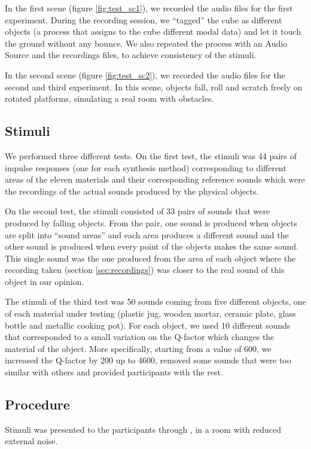 In the first scene (figure \ref{fig:test_sc1}), we recorded the audio files for the first experiment. During the recording session, we ``tagged'' the cube as different objects (a process that assigns to the cube different modal data) and let it touch the ground without any bounce. We also repeated the process with an Audio Source and the recordings files, to achieve consistency of the stimuli.

In the second scene (figure \ref{fig:test_sc2}), we recorded the audio files for the second and third experiment. In this scene, objects fall, roll and scratch freely on rotated platforms, simulating a real room with obstacles.

\subsection{Stimuli}
We performed three different tests. On the first test, the stimuli was 44 pairs of impulse responses (one for each synthesis method) corresponding to different areas of the eleven materials and their corresponding reference sounds which were the recordings of the actual sounds produced by the physical objects. 

On the second test, the stimuli consisted of 33 pairs of sounds that were produced by falling objects. From the pair, one sound is produced when objects are split into ``sound areas'' and each area produces a different sound and the other sound is produced when every point of the objects makes the same sound. This single sound was the one produced from the area of each object where the recording taken (section \ref{sec:recordings}) was closer to the real sound of this object in our opinion.  

The stimuli of the third test was 50 sounds coming from five different objects, one of each material under testing (plastic jug, wooden mortar, ceramic plate, glass bottle and metallic cooking pot). For each object, we used 10 different sounds that corresponded to a small variation on the Q-factor which changes the material of the object. More specifically, starting from a value of 600, we increased the Q-factor by 200 up to 4600, removed some sounds that were too similar with others and provided participants with the rest.

\subsection{Procedure}
Stimuli was presented to the participants through , in a room with reduced external noise.

